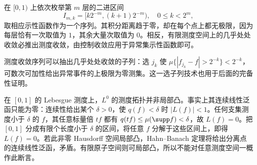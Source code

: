 \begin{example}[测度收敛与几乎处处收敛]
在 $[0,1)$ 上依次枚举第 $m$ 层的二进区间
\[
 I_{m,k}=[k2^{-m},(k+1)2^{-m}),\quad 0\le k<2^m,
\]
取相应示性函数作为一个序列。其积分距离趋于零，却在每个点上都无极限，因为每层恰有一次取值为 $1$，其余大量次取值为 $0$。相反，有限测度空间上的几乎处处收敛必推出测度收敛，由控制收敛应用于异常集示性函数即可。
\end{example}
测度收敛序列可以抽出几乎处处收敛的子列：选 $j_k$ 使 $\mu\{|f_{j_k}-f|>2^{-k}\}<2^{-k}$，可数次可加性给出异常事件的上极限为零测集。这一选子列技术也用于后面的完备性证明。

\begin{remark}[补充：非局部凸性需要测度条件]
在 $[0,1]$ 的 Lebesgue 测度上，$L^0$ 的测度拓扑并非局部凸。事实上其连续线性泛函只能为零：连续性给出某个 $\delta>0$，使 $q(f)<\delta$ 时 $|L(f)|<1$。任何支集测度小于 $\delta$ 的 $f$，其任意标量倍 $tf$ 都有 $q(tf)\le\mu(\supp f)<\delta$，故 $L(f)=0$。把 $[0,1]$ 分成有限个长度小于 $\delta$ 的区间，将任意 $f$ 分解于这些区间上，即得 $L(f)=0$。若此非零 Hausdorff 空间局部凸，Hahn--Banach 定理将给出分离点的连续线性泛函，矛盾。有限原子空间则可局部凸，所以不能对任意测度空间一概作此断言。
\end{remark}

